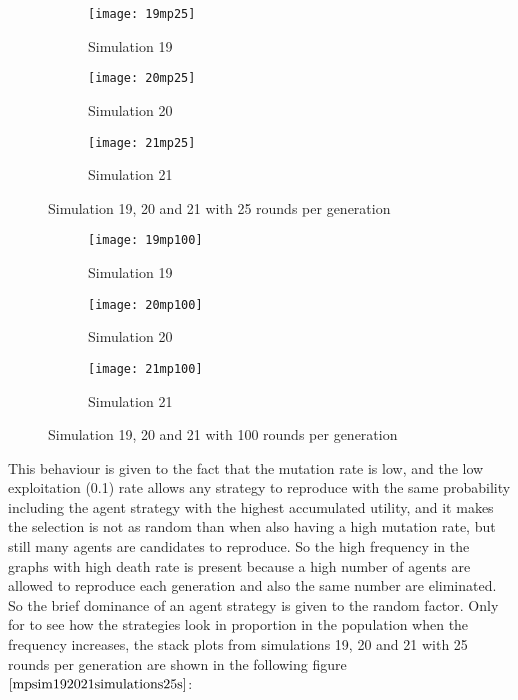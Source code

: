 \begin{figure}[H]       
    \centering
    \begin{subfigure}[b]{0.3\textwidth}
	\centering
	{\texttt{[image: 19mp25]}}   
    	\caption{Simulation 19}
	\label{fig:mpsim1925}
    \end{subfigure}
    \hfill
    \begin{subfigure}[b]{0.3\textwidth}
	\centering
	{\texttt{[image: 20mp25]}}   
    	\caption{Simulation 20}
	\label{fig:mpsim2025}
    \end{subfigure}
    \hfill
    \begin{subfigure}[b]{0.3\textwidth}
	\centering
	{\texttt{[image: 21mp25]}}   
    	\caption{Simulation 21}
	\label{fig:mpsim2125}
    \end{subfigure}
    \caption{Simulation 19, 20 and 21 with 25 rounds per generation}
    \label{mpsim192021simulations25}
\end{figure}

\begin{figure}[H]       
    \centering
    \begin{subfigure}[b]{0.3\textwidth}
	\centering
	{\texttt{[image: 19mp100]}}   
    	\caption{Simulation 19}
	\label{fig:mpsim19100}
    \end{subfigure}
    \hfill
    \begin{subfigure}[b]{0.3\textwidth}
	\centering
	{\texttt{[image: 20mp100]}}   
    	\caption{Simulation 20}
	\label{fig:mpsim20100}
    \end{subfigure}
    \hfill
    \begin{subfigure}[b]{0.3\textwidth}
	\centering
	{\texttt{[image: 21mp100]}}   
    	\caption{Simulation 21}
	\label{fig:mpsim21100}
    \end{subfigure}
    \caption{Simulation 19, 20 and 21 with 100 rounds per generation}
    \label{mpsim192021simulations100}
\end{figure}

This behaviour is given to the fact that the mutation rate is low, and the low exploitation (0.1) rate allows any  strategy to reproduce with the same probability including the agent strategy with the highest accumulated utility, and it makes the selection is not as random than when also having a high mutation rate, but still many agents are candidates to reproduce. So the high frequency in the graphs with high death rate is present because  a high number of agents are allowed to reproduce each generation and also the same number are eliminated. So the brief dominance of an agent strategy is given to the random factor. 
Only for to see how the strategies look in proportion in the population when the frequency increases, the stack plots from simulations 19, 20 and 21 with 25 rounds per generation are shown in the following figure $\ref{mpsim192021simulations25s}$:

